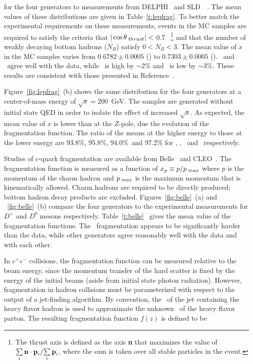 \noindent
for the four generators to measurements from DELPHI~\cite{DELPHI}  and SLD~\cite{SLD}~. The mean values of these distributions are given in Table~\ref{t:lepfrag}.
To better match the experimental requirements on these measurements, events in the MC samples
are required to satisfy the criteria that $|\cos{\theta}_{\textrm\;thrust}|<$ 0.7 ~\footnote{The thrust axis is defined as the axis {\textbf n} that maximizes the value of${\sum\limits_{i} {\textbf n} \cdot {\textbf p_i}}/{\sum\limits_{i} {\textbf p_i} }$, where the sum is taken over all stable particles in the event.} and that
the number of weakly decaying bottom hadrons ($N_B$) satisfy $0 < N_{B}  < 3$.  The mean value of $x$
in the MC samples varies from $0.6782\pm 0.0005$ (\Herwig) to $0.7303\pm 0.0005$ (\PythiaE).
\Pythia\ and \Herwigpp\ agree well with the data, while \PythiaE\ is high by $\sim 2\%$ and
\Herwig\ is low by $\sim 3\%$.  These results are consistent with those presented in Reference~\cite{Karneyeu:2013aha}.

Figure~\ref{fig:lepfrag}~(b) shows the same distribution
for the four generators at a center-of-mass energy of $\sqrt{s}=200$~GeV.  The samples are generated without initial state QED in order to isolate the effect of increased $\sqrt{s}$.  As expected,
the mean value of $x$ is lower than at the $Z$-pole, due the evolution of the
fragmentation function.  The ratio of the means at the higher energy to those at the 
lower energy are 93.8\%, 95.8\%, 94.0\%\ and 97.2\% for \PythiaE, \Pythia, \Herwigpp\ and \Herwig\ 
respectively.

Studies of $c$-quark fragmentation are available from Belle~\cite{Belle} and CLEO~\cite{CLEO}. 
The fragmentation function is measured as a function of $x_p \equiv p/p_{\textrm\;max}$ where
$p$ is the momentum of the charm hadron and $p_{\textrm\;max}$ is the maximum momentum that
is kinematically allowed.  Charm hadrons are required to be directly produced; bottom hadron decay products are
excluded.
Figures~\ref{fig:belle}~(a) and ~\ref{fig:belle}~(b) compare the four generators to the experimental measurements for $D^+$ and
$D^0$ mesons respectively. Table~\ref{t:belle}~ gives the mean value of the fragmentation functions. The \PythiaE\ fragmentation appears to be significantly harder than the data, while 
other generators agree reasonably well with the data and with each other.

In $e^+e^-$ collisions, the fragmentation function can be measured relative to the beam energy, since the 
momentum transfer of the hard scatter is fixed by the energy of the initial beams (aside from initial state photon radiation). However, fragmentation in hadron collisions must be parameterized with respect to the output of a jet-finding algorithm. By convention, the \pT\ of the jet containing the
heavy flavor hadron is used to approximate the unknown \pT\ of the heavy flavor parton.
The resulting fragmentation function $f(z)$ is defined to be

